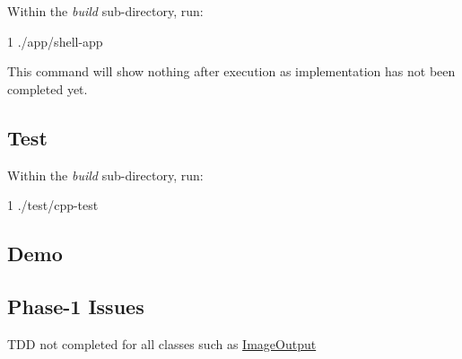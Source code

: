 Within the {\itshape build} sub-\/directory, run\+: 
\begin{DoxyCode}
1 ./app/shell-app
\end{DoxyCode}
 This command will show nothing after execution as implementation has not been completed yet.

\subsection*{Test}

Within the {\itshape build} sub-\/directory, run\+: 
\begin{DoxyCode}
1 ./test/cpp-test
\end{DoxyCode}


\subsection*{Demo}

\subsection*{Phase-\/1 Issues}


\begin{DoxyItemize}
\item T\+DD not completed for all classes such as \hyperlink{classImageOutput}{Image\+Output} 
\end{DoxyItemize}